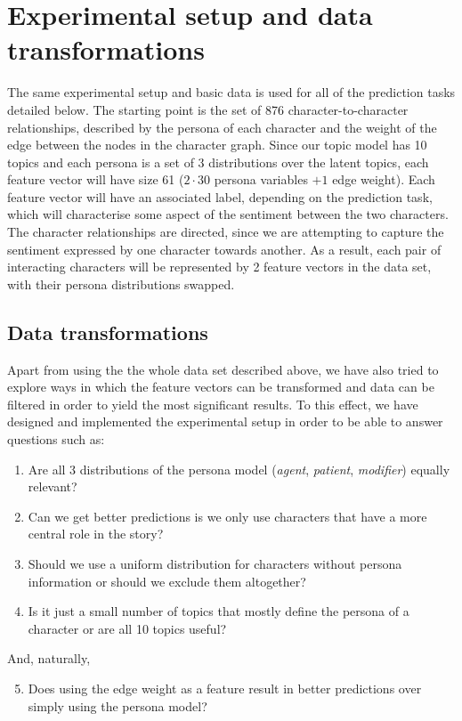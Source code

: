 \documentclass[bsc,frontabs,singlespacing,parskip, twoside]{infthesis}
\begin{document}
\section{Experimental setup and data transformations}
The same experimental setup and basic data is used for all of the prediction tasks detailed below. The starting point is the set of 876 character-to-character relationships, described by the persona of each character and the weight of the edge between the nodes in the character graph. Since our topic model has 10 topics and each persona is a set of 3 distributions over the latent topics, each feature vector will have size 61 ($2 \cdot 30$ persona variables $+ 1$ edge weight). Each feature vector will have an associated label, depending on the prediction task, which will characterise some aspect of the sentiment between the two characters. The character relationships are directed, since we are attempting to capture the sentiment expressed by one character towards another. As a result, each pair of interacting characters will be represented by 2 feature vectors in the data set, with their persona distributions swapped.

\subsection{Data transformations}
Apart from using the the whole data set described above, we have also tried to explore ways in which the feature vectors can be transformed and data can be filtered in order to yield the most significant results. To this effect, we have designed and implemented the experimental setup in order to be able to answer questions such as:
\begin{enumerate}
	\item Are all 3 distributions of the persona model (\textit{agent}, \textit{patient}, \textit{modifier}) equally relevant?
	\item Can we get better predictions is we only use characters that have a more central role in the story?
	\item Should we use a uniform distribution for characters without persona information or should we exclude them altogether?
	\item Is it just a small number of topics that mostly define the persona of a character or are all 10 topics useful?
\end{enumerate}
And, naturally,
\begin{enumerate}
	\setcounter{enumi}{4}
	\item Does using the edge weight as a feature result in better predictions over simply using the persona model?
\end{enumerate}
\end{document}
